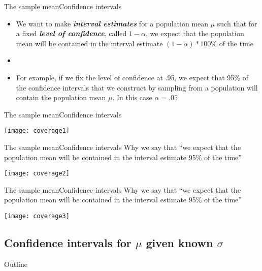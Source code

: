 \documentclass[xcolor=dvipsnames]{beamer}
\begin{document}
\begin{frame}{The sample mean}{Confidence intervals}
	\begin{itemize}
		\item We want to make \textbf{\emph{interval estimates}} for a population mean $\mu$ such that for a fixed \textbf{\emph{level of confidence}}, called $1-\alpha$,
		we expect that the population mean will be contained in the interval estimate $(1-\alpha) * 100 \%$ of the time \pause 
		\item[]
		\item For example, if we fix the level of confidence at .95, we expect that 95\% of the confidence intervals that we construct by sampling from a population will contain the population mean $\mu$. In this case $\alpha = .05$
	\end{itemize}
\end{frame}

\begin{frame}{The sample mean}{Confidence intervals}
	\begin{center}
		\texttt{[image: coverage1]}
	\end{center}
\end{frame}

\begin{frame}{The sample mean}{Confidence intervals}
	Why we say that ``we expect that the population mean will be contained in the interval estimate 95\% of the time''
	\begin{center}
		\texttt{[image: coverage2]}
	\end{center}
\end{frame}

\begin{frame}{The sample mean}{Confidence intervals}
	Why we say that ``we expect that the population mean will be contained in the interval estimate 95\% of the time''
	\begin{center}
		\texttt{[image: coverage3]}
	\end{center}
\end{frame}

\subsection{Confidence intervals for $\mu$ given known $\sigma$}
\begin{frame}{Outline}
	\tableofcontents[currentsection,subsectionstyle=show/shaded/hide]
\end{frame}
\end{document}
